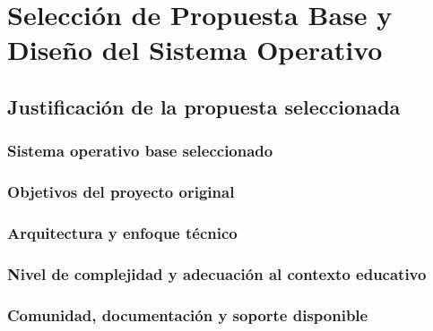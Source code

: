 \chapter{Selección de Propuesta Base y Diseño del Sistema Operativo}

\section{Justificación de la propuesta seleccionada}
\subsection{Sistema operativo base seleccionado}
\subsection{Objetivos del proyecto original}
\subsection{Arquitectura y enfoque técnico}
\subsection{Nivel de complejidad y adecuación al contexto educativo}
\subsection{Comunidad, documentación y soporte disponible}